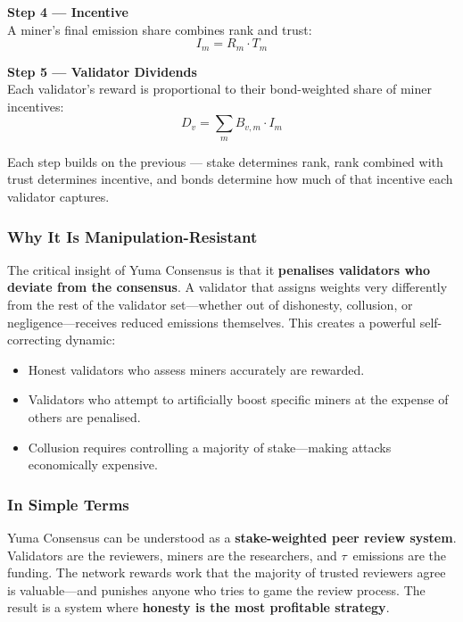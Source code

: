 \documentclass[12pt, a4paper, oneside]{report}
\newcommand{\TAO}{$\tau$}            %
\theoremstyle{definition}
\begin{document}
\textbf{Step 4 — Incentive}\\
A miner's final emission share combines rank and trust:
\[
  I_m = R_m \cdot T_m
\]

\textbf{Step 5 — Validator Dividends}\\
Each validator's reward is proportional to their bond-weighted share of miner incentives:
\[
  D_v = \sum_{m} B_{v,m} \cdot I_m
\]

\noindent Each step builds on the previous — stake determines rank, rank combined 
with trust determines incentive, and bonds determine how much of that incentive 
each validator captures.




\subsubsection*{Why It Is Manipulation-Resistant}

The critical insight of Yuma Consensus is that it \textbf{penalises validators 
who deviate from the consensus}. A validator that assigns weights very differently 
from the rest of the validator set—whether out of dishonesty, collusion, or 
negligence—receives reduced emissions themselves. This creates a powerful 
self-correcting dynamic:

\begin{itemize}
  \item Honest validators who assess miners accurately are rewarded.
  \item Validators who attempt to artificially boost specific miners at the 
        expense of others are penalised.
  \item Collusion requires controlling a majority of stake—making attacks 
        economically expensive.
\end{itemize}

\subsubsection*{In Simple Terms}

Yuma Consensus can be understood as a \textbf{stake-weighted peer review system}. 
Validators are the reviewers, miners are the researchers, and \TAO\ emissions are 
the funding. The network rewards work that the majority of trusted reviewers 
agree is valuable—and punishes anyone who tries to game the review process. 
The result is a system where \textbf{honesty is the most profitable strategy}.
\end{document}
